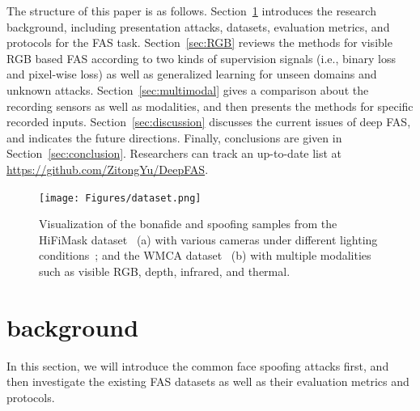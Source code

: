 \documentclass[10pt,journal,compsoc]{IEEEtran}
\begin{document}
The structure of this paper is as follows. Section~\ref{sec:background} introduces the research background, including presentation attacks, datasets, evaluation metrics, and protocols for the FAS task. Section~\ref{sec:RGB} reviews the methods for visible RGB based FAS according to two kinds of supervision signals (i.e., binary loss and pixel-wise loss) as well as generalized learning for unseen domains and unknown attacks. Section~\ref{sec:multimodal} gives a comparison about the recording sensors as well as modalities, and then presents the methods for specific recorded inputs. Section~\ref{sec:discussion} discusses the current issues of deep FAS, and indicates the future directions. Finally, conclusions are given in Section~\ref{sec:conclusion}. Researchers can track an up-to-date list at \href{https://github.com/ZitongYu/DeepFAS}{https://github.com/ZitongYu/DeepFAS}.

\begin{figure}
\centering
\texttt{[image: Figures/dataset.png]}
\vspace{-0.3em}
  \caption{ 
  Visualization of the bonafide and spoofing samples from the HiFiMask dataset~\cite{liu2021contrastive} (a) with various cameras under different lighting conditions~\cite{liu2021contrastive}; and the WMCA dataset~\cite{george2019biometric} (b) with multiple modalities such as visible RGB, depth, infrared, and thermal.
  }
\label{fig:dataset}
\vspace{-0.8em}
\end{figure}



\vspace{-1.0em}
\section{background} \label{sec:background}

In this section, we will introduce the common face spoofing attacks first, and then investigate the existing FAS datasets as well as their evaluation metrics and protocols.  


\vspace{-1.0em}
\end{document}
